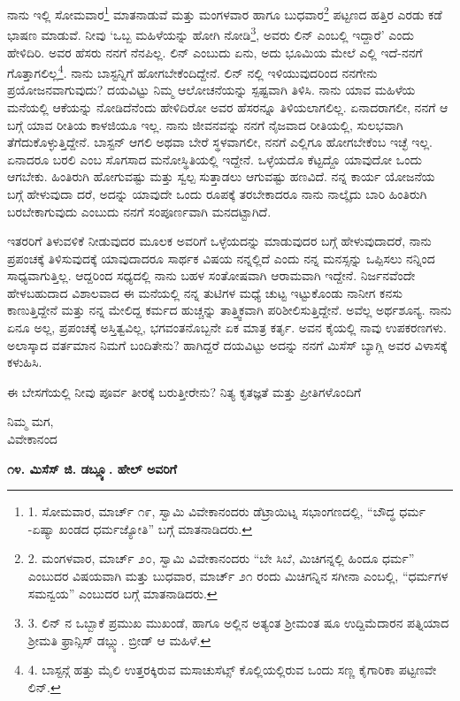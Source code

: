 ನಾನು ಇಲ್ಲಿ ಸೋಮವಾರ\footnote{1. ಸೋಮವಾರ, ಮಾರ್ಚ್ ೧೯, ಸ್ವಾಮಿ ವಿವೇಕಾನಂದರು ಡೆಟ್ರಾಯಿಟ್ನ ಸಭಾಂಗಣದಲ್ಲಿ, “ಬೌದ್ಧ ಧರ್ಮ -ಏಷ್ಯಾ ಖಂಡದ ಧರ್ಮಜ್ಯೋತಿ” ಬಗ್ಗೆ ಮಾತನಾಡಿದರು.} ಮಾತನಾಡುವೆ ಮತ್ತು ಮಂಗಳವಾರ ಹಾಗೂ ಬುಧವಾರ\footnote{2. ಮಂಗಳವಾರ, ಮಾರ್ಚ್ ೨೦, ಸ್ವಾಮಿ ವಿವೇಕಾನಂದರು “ಬೇ ಸಿಬೆ, ಮಿಚಿಗನ್ನಲ್ಲಿ ಹಿಂದೂ ಧರ್ಮ” ಎಂಬುದರ ವಿಷಯವಾಗಿ ಮತ್ತು ಬುಧವಾರ, ಮಾರ್ಚ್ ೨೧ ರಂದು ಮಿಚಿಗನ್ನಿನ ಸಗೀನಾ ಎಂಬಲ್ಲಿ, “ಧರ್ಮಗಳ ಸಮನ್ವಯ” ಎಂಬುದರ ಬಗ್ಗೆ ಮಾತನಾಡಿದರು.} ಪಟ್ಟಣದ ಹತ್ತಿರ ಎರಡು ಕಡೆ ಭಾಷಣ ಮಾಡುವೆ. ನೀವು ‘ಒಬ್ಬ ಮಹಿಳೆಯನ್ನು ಹೋಗಿ ನೋಡಿ\footnote{3. ಲಿನ್ ನ ಒಬ್ಬಾಕೆ ಪ್ರಮುಖ ಮುಖಂಡೆ, ಹಾಗೂ ಅಲ್ಲಿನ ಅತ್ಯಂತ ಶ‍್ರೀಮಂತ ಷೂ ಉದ್ದಿಮೆದಾರನ ಪತ್ನಿಯಾದ ಶ‍್ರೀಮತಿ ಫ್ರಾನ್ಸಿಸ್ ಡಬ್ಲ್ಯು. ಬ್ರೀಡ್ ಆ ಮಹಿಳೆ.}, ಅವರು ಲಿನ್ ಎಂಬಲ್ಲಿ ಇದ್ದಾರೆ’ ಎಂದು ಹೇಳಿದಿರಿ. ಅವರ ಹೆಸರು ನನಗೆ ನೆನಪಿಲ್ಲ. ಲಿನ್ ಎಂಬುದು ಏನು, ಅದು ಭೂಮಿಯ ಮೇಲೆ ಎಲ್ಲಿ ಇದೆ-ನನಗೆ ಗೊತ್ತಾಗಲಿಲ್ಲ\footnote{4. ಬಾಸ್ಟನ್ಗೆ ಹತ್ತು ಮೈಲಿ ಉತ್ತರಕ್ಕಿರುವ ಮಸಾಚುಸೆಟ್ಸ್ ಕೊಲ್ಲಿಯಲ್ಲಿರುವ ಒಂದು ಸಣ್ಣ ಕೈಗಾರಿಕಾ ಪಟ್ಟಣವೇ ಲಿನ್.}. ನಾನು ಬಾಸ್ಟನ್ನಿಗೆ ಹೋಗಬೇಕೆಂದಿದ್ದೇನೆ. ಲಿನ್ ನಲ್ಲಿ ಇಳಿಯುವುದರಿಂದ ನನಗೇನು ಪ್ರಯೋಜನವಾಗುವುದು? ದಯವಿಟ್ಟು ನಿಮ್ಮ ಆಲೋಚನೆಯನ್ನು ಸ್ಪಷ್ಟವಾಗಿ ತಿಳಿಸಿ. ನಾನು ಯಾವ ಮಹಿಳೆಯ ಮನೆಯಲ್ಲಿ ಆಕೆಯನ್ನು ನೋಡಿದೆನೆಂದು ಹೇಳಿದಿರೋ ಅವರ ಹೆಸರನ್ನೂ ತಿಳಿಯಲಾಗಲಿಲ್ಲ. ಏನಾದರಾಗಲೀ, ನನಗೆ ಆ ಬಗ್ಗೆ ಯಾವ ರೀತಿಯ ಕಾಳಜಿಯೂ ಇಲ್ಲ. ನಾನು ಜೀವನವನ್ನು ನನಗೆ ನೈಜವಾದ ರೀತಿಯಲ್ಲಿ, ಸುಲಭವಾಗಿ ತೆಗೆದುಕೊಳ್ಳುತ್ತಿದ್ದೇನೆ. ಬಾಸ್ಟನ್ ಆಗಲಿ ಅಥವಾ ಬೇರೆ ಸ್ಥಳವಾಗಲೀ, ನನಗೆ ಎಲ್ಲಿಗೂ ಹೋಗಬೇಕೆಂಬ ಇಚ್ಛೆ ಇಲ್ಲ. ಏನಾದರೂ ಬರಲಿ ಎಂಬ ಸೊಗಸಾದ ಮನೋಸ್ಥಿತಿಯಲ್ಲಿ ಇದ್ದೇನೆ. ಒಳ್ಳೆಯದೊ ಕೆಟ್ಟದ್ದೊ ಯಾವುದೋ ಒಂದು ಆಗಬೇಕು. ಹಿಂತಿರುಗಿ ಹೋಗುವಷ್ಟು ಮತ್ತು ಸ್ವಲ್ಪ ಸುತ್ತಾಡಲು ಆಗುವಷ್ಟು ಹಣವಿದೆ. ನನ್ನ ಕಾರ್ಯ ಯೋಜನೆಯ ಬಗ್ಗೆ ಹೇಳುವುದಾ ದರೆ, ಅದನ್ನು ಯಾವುದೇ ಒಂದು ರೂಪಕ್ಕೆ ತರಬೇಕಾದರೂ ನಾನು ನಾಲ್ಕೈದು ಬಾರಿ ಹಿಂತಿರುಗಿ ಬರಬೇಕಾಗುವುದು ಎಂಬುದು ನನಗೆ ಸಂಪೂರ್ಣವಾಗಿ ಮನದಟ್ಟಾಗಿದೆ.

ಇತರರಿಗೆ ತಿಳುವಳಿಕೆ ನೀಡುವುದರ ಮೂಲಕ ಅವರಿಗೆ ಒಳ್ಳೆಯದನ್ನು ಮಾಡುವುದರ ಬಗ್ಗೆ ಹೇಳುವುದಾದರೆ, ನಾನು ಪ್ರಪಂಚಕ್ಕೆ ತಿಳಿಸುವುದಕ್ಕೆ ಯಾವುದಾದರೂ ಸಾರ್ಥಕ ವಿಷಯ ನನ್ನಲ್ಲಿದೆ ಎಂದು ನನ್ನ ಮನಸ್ಸನ್ನು ಒಪ್ಪಿಸಲು ನನ್ನಿಂದ ಸಾಧ್ಯವಾಗುತ್ತಿಲ್ಲ. ಆದ್ದರಿಂದ ಸಧ್ಯದಲ್ಲಿ ನಾನು ಬಹಳ ಸಂತೋಷವಾಗಿ ಆರಾಮವಾಗಿ ಇದ್ದೇನೆ. ನಿರ್ಜನವೆಂದೇ ಹೇಳಬಹುದಾದ ವಿಶಾಲವಾದ ಈ ಮನೆಯಲ್ಲಿ ನನ್ನ ತುಟಿಗಳ ಮಧ್ಯೆ ಚುಟ್ಟ ಇಟ್ಟುಕೊಂಡು ನಾನೀಗ ಕನಸು ಕಾಣುತ್ತಿದ್ದೇನೆ ಮತ್ತು ನನ್ನ ಮೇಲಿದ್ದ ಕರ್ಮದ ಹುಚ್ಚನ್ನು ತಾತ್ತ್ವಿಕವಾಗಿ ಪರಿಶೀಲಿಸುತ್ತಿದ್ದೇನೆ. ಅವೆಲ್ಲ ಅರ್ಥಶೂನ್ಯ. ನಾನು ಏನೂ ಅಲ್ಲ, ಪ್ರಪಂಚಕ್ಕೆ ಅಸ್ತಿತ್ವವಿಲ್ಲ, ಭಗವಂತನೊಬ್ಬನೇ ಏಕ ಮಾತ್ರ ಕರ್ತೃ. ಅವನ ಕೈಯಲ್ಲಿ ನಾವು ಉಪಕರಣಗಳು. ಅಲಾಸ್ಕಾದ ವರ್ತಮಾನ ನಿಮಗೆ ಬಂದಿತೇನು? ಹಾಗಿದ್ದರೆ ದಯವಿಟ್ಟು ಅದನ್ನು ನನಗೆ ಮಿಸೆಸ್ ಬ್ಯಾಗ್ಲಿ ಅವರ ವಿಳಾಸಕ್ಕೆ ಕಳುಹಿಸಿ.

ಈ ಬೇಸಗೆಯಲ್ಲಿ ನೀವು ಪೂರ್ವ ತೀರಕ್ಕೆ ಬರುತ್ತೀರೇನು? ನಿತ್ಯ ಕೃತಜ್ಞತೆ ಮತ್ತು ಪ್ರೀತಿಗಳೊಂದಿಗೆ

\begin{flushright}
ನಿಮ್ಮ ಮಗ,\\ವಿವೇಕಾನಂದ
\end{flushright}

\begin{center}
\textbf{೧೪. ಮಿಸೆಸ್ ಜಿ. ಡಬ್ಲ್ಯೂ. ಹೇಲ್ ಅವರಿಗೆ}
\end{center}

